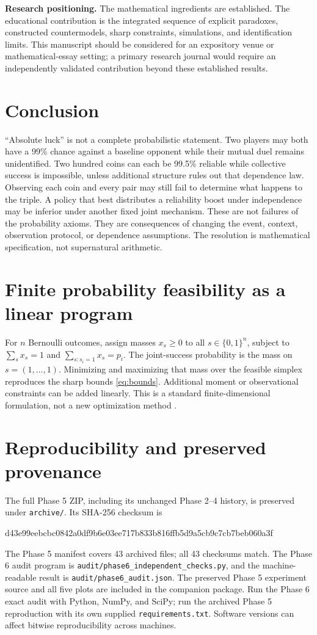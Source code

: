 \documentclass[11pt,a4paper]{article}
\begin{document}
\textbf{Research positioning.} The mathematical ingredients are established. The educational contribution is the integrated sequence of explicit paradoxes, constructed countermodels, sharp constraints, simulations, and identification limits. This manuscript should be considered for an expository venue or mathematical-essay setting; a primary research journal would require an independently validated contribution beyond these established results.

\section{Conclusion}

``Absolute luck'' is not a complete probabilistic statement. Two players may both have a 99\% chance against a baseline opponent while their mutual duel remains unidentified. Two hundred coins can each be 99.5\% reliable while collective success is impossible, unless additional structure rules out that dependence law. Observing each coin and every pair may still fail to determine what happens to the triple. A policy that best distributes a reliability boost under independence may be inferior under another fixed joint mechanism. These are not failures of the probability axioms. They are consequences of changing the event, context, observation protocol, or dependence assumptions. The resolution is mathematical specification, not supernatural arithmetic.

\appendix
\section{Finite probability feasibility as a linear program}
For $n$ Bernoulli outcomes, assign masses $x_s\ge0$ to all $s\in\{0,1\}^n$, subject to $\sum_s x_s=1$ and $\sum_{s:s_i=1}x_s=p_i$. The joint-success probability is the mass on $s=(1,\ldots,1)$. Minimizing and maximizing that mass over the feasible simplex reproduces the sharp bounds \eqref{eq:bounds}. Additional moment or observational constraints can be added linearly. This is a standard finite-dimensional formulation, not a new optimization method \cite{hoppe}.

\section{Reproducibility and preserved provenance}
The full Phase 5 ZIP, including its unchanged Phase 2--4 history, is preserved under \texttt{archive/}. Its SHA-256 checksum is
\begin{center}\ttfamily\footnotesize d43e99eebcbc0842a0df9b6e03ee717b833b816ffb5d9a5cb9c7cb7beb060a3f\end{center}
The Phase 5 manifest covers 43 archived files; all 43 checksums match. The Phase 6 audit program is \texttt{audit/phase6\_independent\_checks.py}, and the machine-readable result is \texttt{audit/phase6\_audit.json}. The preserved Phase 5 experiment source and all five plots are included in the companion package. Run the Phase 6 exact audit with Python, NumPy, and SciPy; run the archived Phase 5 reproduction with its own supplied \texttt{requirements.txt}. Software versions can affect bitwise reproducibility across machines.
\end{document}
